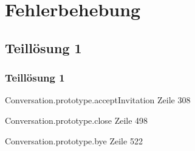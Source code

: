 \documentclass{beamer}
\begin{document}

\section{Fehlerbehebung}
\subsection{Teillösung 1}
\begin{frame}
	\frametitle{Teillösung 1}
	\begin{exampleblock}{Conversation.prototype.acceptInvitation Zeile 308}
	
	\end{exampleblock}

	\begin{exampleblock}{Conversation.prototype.close Zeile 498}
	
	\end{exampleblock}
	
	\begin{exampleblock}{Conversation.prototype.bye Zeile 522}
	
	\end{exampleblock}
\end{frame}
\end{document}
